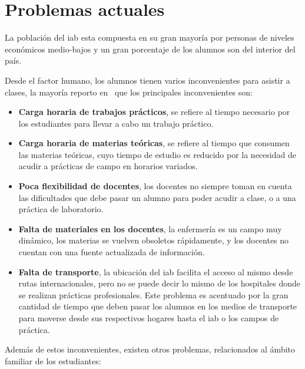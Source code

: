 \section{Problemas actuales}
\label{sec:problemas_actuales}

La población del \Gls{iab} esta compuesta en su gran mayoría por personas de
niveles económicos medio-bajos y un gran porcentaje de los alumnos son del
interior del país.

Desde el factor humano, los alumnos tienen varios inconvenientes para asistir a
clases, la mayoría reporto en~\cite{iab:tesis_alumnos} que los principales
inconvenientes son:

\begin{itemize}
    \item \textbf{Carga horaria de trabajos prácticos}, se refiere al tiempo necesario
        por los estudiantes para llevar a cabo un trabajo práctico. 
    \item \textbf{Carga horaria de materias teóricas}, se refiere al tiempo que consumen
        las materias teóricas, cuyo tiempo de estudio es reducido por la
        necesidad de acudir a prácticas de campo en horarios variados.
    \item \textbf{Poca flexibilidad de docentes}, los docentes no siempre toman en cuenta
        las dificultades que debe pasar un alumno para poder acudir a clase, o a
        una práctica de laboratorio.
    \item \textbf{Falta de materiales en los docentes}, la enfermería es un campo muy
        dinámico, los materias se vuelven obsoletos rápidamente, y los docentes
        no cuentan con una fuente actualizada de información.
    \item \textbf{Falta de transporte}, la ubicación del \Gls{iab} facilita el acceso al
        mismo desde rutas internacionales, pero no se puede decir lo mismo de
        los hospitales donde se realizan prácticas profesionales. Este problema
        es acentuado por la gran cantidad de tiempo que deben pasar los alumnos
        en los medios de transporte para moverse desde sus respectivos hogares
        hasta el \Gls{iab} o los campos de práctica.
\end{itemize}

Además de estos inconvenientes, existen otros problemas, relacionados al ámbito
familiar de los estudiantes\cite{iab:tesis_alumnos}:

